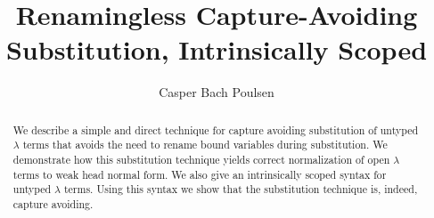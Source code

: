 \documentclass[a4paper,UKenglish,cleveref, autoref, thm-restate]{oasics-v2021}
\title{Renamingless Capture-Avoiding Substitution, Intrinsically Scoped}
\author{Casper {Bach Poulsen}}{Delft University of Technology, Netherlands \and \url{http://www.casperbp.net} }{c.b.poulsen@tudelft.nl}{https://orcid.org/0000-0003-0622-7639}{}%
\begin{document}
\maketitle

\begin{abstract}
  We describe a simple and direct technique for capture avoiding substitution of untyped $\lambda$ terms that avoids the need to rename bound variables during substitution.
  We demonstrate how this substitution technique yields correct normalization of open $\lambda$ terms to weak head normal form.
  We also give an intrinsically scoped syntax for untyped $\lambda$ terms.
  Using this syntax we show that the substitution technique is, indeed, capture avoiding.
\end{abstract}











\end{document}
